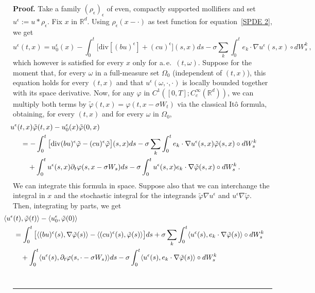 \documentclass[a4paper,10pt]{article}
\newenvironment{proof}[1][Proof]{\noindent\textbf{#1.} }{\ \rule{0.5em}{0.5em}}
\newcommand{\mr}{\mathbb{R}}
\newcommand{\lan}{\langle}
\newcommand{\ran}{\rangle}
\newcommand{\diverg}{\mathrm{div}}
\newcommand{\td}{\tilde}
\newcommand{\eps}{\epsilon}
\begin{document}
\begin{proof}
Take a family $(\rho_\epsilon)_\epsilon$ of even, compactly supported mollifiers and set $u^\epsilon :=u*\rho_\eps$. Fix $x$ in $\mr^d$. Using $\rho_\eps(x-\cdot)$ as test function for equation~\eqref{SPDE 2}, we get
\begin{equation}
u^\eps(t,x)= u^\eps_0(x) -\int^t_0 \big[\diverg[(b u)^\eps]+(c u )^\eps \big] (s,x) ds -\sigma \sum_k\int^t_0 e_k\cdot\nabla u^\eps(s,x)\circ dW^k_s \, ,\label{u^eps}
\end{equation}
which however is satisfied for every $x$ only for a.\,e.\ $(t,\omega)$. Suppose for the moment that, for every $\omega$ in a full-measure set $\Omega_0$ (independent of $(t,x)$), this equation holds for every $(t,x)$ and that $u^\eps(\omega,\cdot,\cdot)$ is locally bounded together with its space derivative. Now, for any $\varphi$ in $C^1([0,T];C^\infty_c(\mr^d))$, we can multiply both terms by $\td{\varphi}(t,x)=\varphi(t,x-\sigma W_t)$ via the classical It\^o formula, obtaining, for every $(t,x)$ and for every $\omega$ in $\Omega_0$,
\begin{align*}
\lefteqn{ \hspace{-0.5cm} u^\epsilon(t,x)\td{\varphi}(t,x)-u^\epsilon_0(x)\td{\varphi}(0,x) } \\
&= - \int^t_0 \big[\diverg(b u)^\epsilon\td{\varphi}-(c u)^\epsilon\td{\varphi}\big](s,x) ds- \sigma \sum_k\int^t_0e_k\cdot\nabla u^\epsilon(s,x)\td{\varphi}(s,x)\circ dW^k_s\\
& \quad{} +\int^t_0 u^\epsilon(s,x)\partial_t \varphi(s,x- \sigma W_s) ds -\sigma \int^t_0u^\epsilon(s,x) e_k\cdot\nabla\td{\varphi}(s,x)\circ dW^k_s \, .
\end{align*}
We can integrate this formula in space. Suppose also that we can interchange the integral in $x$ and the stochastic integral for the integrands $\td{\varphi}\nabla u^\eps$ and $u^\eps\nabla\td{\varphi}$. Then, integrating by parts, we get
\begin{align*}
\lefteqn{ \hspace{-0.5cm} \lan u^\epsilon(t),\td{\varphi}(t)\ran-\lan u^\epsilon_0,\td{\varphi}(0)\ran } \\
&= \int^t_0 \big[\lan (b u)^\epsilon(s),\nabla\td{\varphi}(s)\ran-\lan (c u)^\epsilon(s),\td{\varphi}(s)\ran \big] ds + \sigma \sum_k\int^t_0\lan u^\epsilon(s),e_k\cdot\nabla\td{\varphi}(s)\ran\circ dW^k_s \\
& \quad{} +\int^t_0\lan u^\epsilon(s),\partial_t\varphi(s,\cdot-\sigma W_s)\ran ds - \sigma \int^t_0\lan u^\epsilon(s),e_k\cdot\nabla\td{\varphi}(s)\ran\circ dW^k_s \\

\end{align*}
\end{proof}
\end{document}
